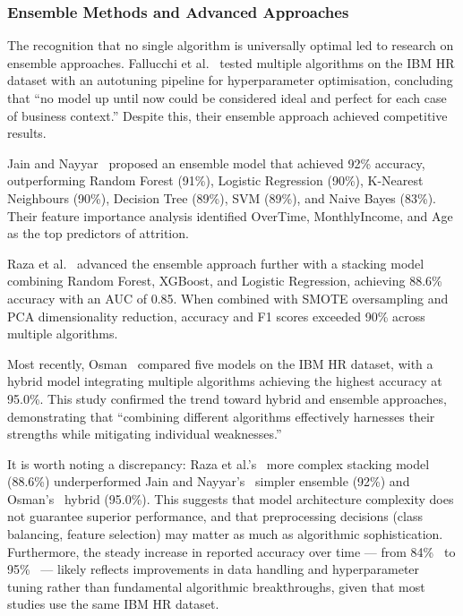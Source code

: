 \documentclass[12pt,a4paper]{article}
\begin{document}
\subsubsection{Ensemble Methods and Advanced Approaches}

The recognition that no single algorithm is universally optimal led to research on ensemble approaches. Fallucchi et al.~\cite{fallucchi2020attrition} tested multiple algorithms on the IBM HR dataset with an autotuning pipeline for hyperparameter optimisation, concluding that ``no model up until now could be considered ideal and perfect for each case of business context.'' Despite this, their ensemble approach achieved competitive results.

Jain and Nayyar~\cite{jain2022ensemble} proposed an ensemble model that achieved 92\% accuracy, outperforming Random Forest (91\%), Logistic Regression (90\%), K-Nearest Neighbours (90\%), Decision Tree (89\%), SVM (89\%), and Naive Bayes (83\%). Their feature importance analysis identified OverTime, MonthlyIncome, and Age as the top predictors of attrition.

Raza et al.~\cite{raza2022stacking} advanced the ensemble approach further with a stacking model combining Random Forest, XGBoost, and Logistic Regression, achieving 88.6\% accuracy with an AUC of 0.85. When combined with SMOTE oversampling and PCA dimensionality reduction, accuracy and F1 scores exceeded 90\% across multiple algorithms.

Most recently, Osman~\cite{osman2025attrition} compared five models on the IBM HR dataset, with a hybrid model integrating multiple algorithms achieving the highest accuracy at 95.0\%. This study confirmed the trend toward hybrid and ensemble approaches, demonstrating that ``combining different algorithms effectively harnesses their strengths while mitigating individual weaknesses.''

It is worth noting a discrepancy: Raza et al.'s~\cite{raza2022stacking} more complex stacking model (88.6\%) underperformed Jain and Nayyar's~\cite{jain2022ensemble} simpler ensemble (92\%) and Osman's~\cite{osman2025attrition} hybrid (95.0\%). This suggests that model architecture complexity does not guarantee superior performance, and that preprocessing decisions (class balancing, feature selection) may matter as much as algorithmic sophistication. Furthermore, the steady increase in reported accuracy over time --- from 84\%~\cite{yadav2018attrition} to 95\%~\cite{osman2025attrition} --- likely reflects improvements in data handling and hyperparameter tuning rather than fundamental algorithmic breakthroughs, given that most studies use the same IBM HR dataset.
\end{document}
